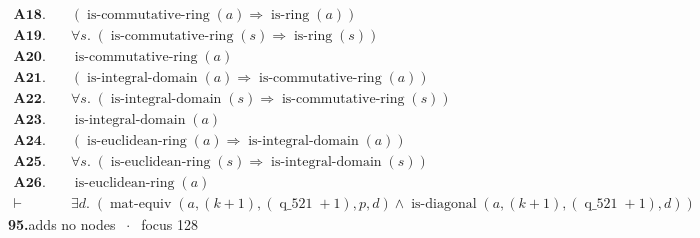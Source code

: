 \documentclass[11pt]{article}
\theoremstyle{plain}
\newcommand{\fit}[1]{\resizebox{\ifdim\width>\linewidth\linewidth\else\width\fi}{!}{#1}}
\begin{document}
\begin{align*}
  \mathbf{A18.}\quad & (\operatorname{is\text{-}commutative\text{-}ring}(a) \Rightarrow \operatorname{is\text{-}ring}(a)) \\
  \mathbf{A19.}\quad & \forall s.\; (\operatorname{is\text{-}commutative\text{-}ring}(s) \Rightarrow \operatorname{is\text{-}ring}(s)) \\
  \mathbf{A20.}\quad & \operatorname{is\text{-}commutative\text{-}ring}(a) \\
  \mathbf{A21.}\quad & (\operatorname{is\text{-}integral\text{-}domain}(a) \Rightarrow \operatorname{is\text{-}commutative\text{-}ring}(a)) \\
  \mathbf{A22.}\quad & \forall s.\; (\operatorname{is\text{-}integral\text{-}domain}(s) \Rightarrow \operatorname{is\text{-}commutative\text{-}ring}(s)) \\
  \mathbf{A23.}\quad & \operatorname{is\text{-}integral\text{-}domain}(a) \\
  \mathbf{A24.}\quad & (\operatorname{is\text{-}euclidean\text{-}ring}(a) \Rightarrow \operatorname{is\text{-}integral\text{-}domain}(a)) \\
  \mathbf{A25.}\quad & \forall s.\; (\operatorname{is\text{-}euclidean\text{-}ring}(s) \Rightarrow \operatorname{is\text{-}integral\text{-}domain}(s)) \\
  \mathbf{A26.}\quad & \operatorname{is\text{-}euclidean\text{-}ring}(a) \\
  \vdash\quad & \exists d.\; (\operatorname{mat\text{-}equiv}(a, (k + 1), (\operatorname{q\_521} + 1), p, d) \wedge \operatorname{is\text{-}diagonal}(a, (k + 1), (\operatorname{q\_521} + 1), d))
\end{align*}
\medskip\noindent\textbf{95.}\quad \fit{\texttt{(ass)}}\hfill{\small adds no nodes $\;\cdot\;$ focus 128}\\[2pt]
\end{document}
